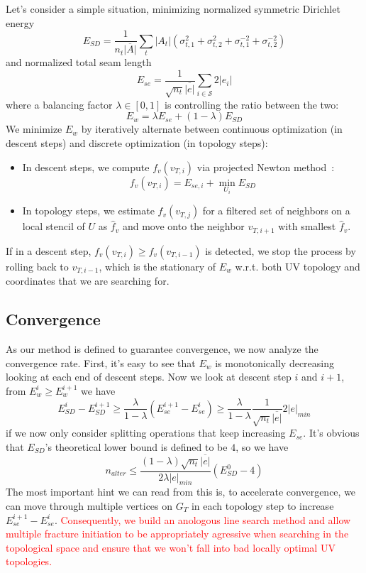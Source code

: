 Let's consider a simple situation, minimizing normalized symmetric Dirichlet energy~\cite{Smith2015Bijective}
\[ E_{SD} = \frac{1}{n_t \overline{|A|}} \sum_t |A_t|(\sigma_{t,1}^2 + \sigma_{t,2}^2 + \sigma_{t,1}^{-2} + \sigma_{t,2}^{-2}) \]
and normalized total seam length
\[ E_{se} = \frac{1}{\sqrt{n_t}\overline{|e|}} \sum_{i \in \mathcal{S}} 2|e_i| \]
where a balancing factor $\lambda \in [0, 1]$ is controlling the ratio between the two: 
\[ E_w = \lambda E_{se} + (1 - \lambda) E_{SD} \]
We minimize $E_w$ by iteratively alternate between continuous optimization (in descent steps) and discrete optimization (in topology steps):
\begin{itemize}
\item In descent steps, we compute $f_v(v_{T,i})$ via projected Newton method~\cite{Teran2005Robust}:
\[ f_v(v_{T,i}) = E_{se,i} + \min_{U_i} E_{SD} \]
\item In topology steps, we estimate $f_v(v_{T,j})$ for a filtered set of neighbors on a local stencil of $U$ as $\hat{f}_v$ and move onto the neighbor $v_{T,i+1}$ with smallest $\hat{f}_v$.
\end{itemize}
If in a descent step, $f_v(v_{T,i}) \geq f_v(v_{T,i-1})$ is detected, we stop the process by rolling back to $v_{T,i-1}$, which is the stationary of $E_w$ w.r.t. both UV topology and coordinates that we are searching for.

\subsection{Convergence}

As our method is defined to guarantee convergence, we now analyze the convergence rate. First, it's easy to see that $E_w$ is monotonically decreasing looking at each end of descent steps. Now we look at descent step $i$ and $i+1$, from $E^i_w \geq E^{i+1}_w$ we have
\[ E^i_{SD} - E^{i+1}_{SD} \geq \frac{\lambda}{1-\lambda} (E^{i+1}_{se} - E^i_{se}) \geq \frac{\lambda}{1-\lambda} \frac{1}{\sqrt{n_t}\overline{|e|}} 2|e|_{min} \]
if we now only consider splitting operations that keep increasing $E_{se}$. It's obvious that $E_{SD}$'s theoretical lower bound is defined to be $4$, so we have
\[ n_{alter} \leq \frac{(1-\lambda)\sqrt{n_t}\overline{|e|}}{2\lambda|e|_{min}} (E^0_{SD} - 4) \]
The most important hint we can read from this is, to accelerate convergence, we can move through multiple vertices on $G_T$ in each topology step to increase $E^{i+1}_{se} - E^i_{se}$. \textcolor{red}{Consequently, we build an anologous line search method and allow multiple fracture initiation to be appropriately agressive when searching in the topological space and ensure that we won't fall into bad locally optimal UV topologies.}


